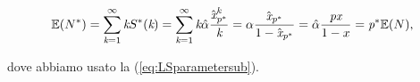 \begin{equation}
\mathbb{E}(N^*)=\sum_{\emph{k}=1}^\infty \emph{k}S^*(\emph{k})=\sum_{\emph{k}=1}^\infty \emph{k} \hat \alpha  \frac{\hat {\emph{x}}^\emph{k}_{\emph{p}^*}}{\emph{k}}=\alpha \frac{\hat {\emph{x}}_{\emph{p}^*}}{1-\hat {\emph{x}}_{\emph{p}^*}}= \hat 	\alpha \frac{\emph{px}}{1-x}= \emph{p}^* \mathbb{E}(N),
\end{equation}

dove abbiamo usato la  (\ref{eq:LSparametersub}).


%
%
%
%
